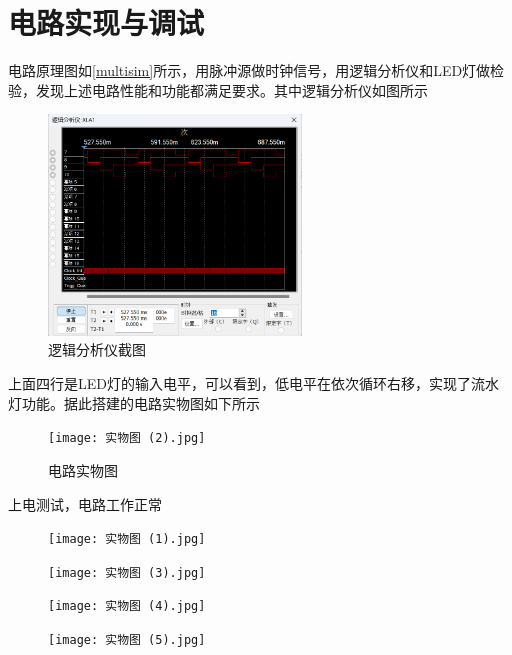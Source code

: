 \documentclass{ctexart}
\begin{document}
\section{电路实现与调试}
电路原理图如\ref{multisim}所示，用脉冲源做时钟信号，用逻辑分析仪和LED灯做检验，发现上述电路性能和功能都满足要求。其中逻辑分析仪如图所示
\begin{figure}[H]
    \centering
    \includegraphics[width=0.6\textwidth]{逻辑分析仪.png}
    \caption{逻辑分析仪截图}
\end{figure}
上面四行是LED灯的输入电平，可以看到，低电平在依次循环右移，实现了流水灯功能。据此搭建的电路实物图如下所示
\begin{figure}[H]
    \centering
    \texttt{[image: 实物图 (2).jpg]}
    \caption{电路实物图}
\end{figure}
上电测试，电路工作正常
\begin{figure}[H]
    \centering
    \begin{minipage}{0.4\textwidth}
    \centering
           \texttt{[image: 实物图 (1).jpg]}
           
    \label{}
    \end{minipage}
    \hspace{0.05\textwidth}
    \begin{minipage}{0.4\textwidth}
    \centering
           \texttt{[image: 实物图 (3).jpg]}
           
    \label{7474}
    \end{minipage}
\end{figure}
\begin{figure}[H]
    \centering
    \begin{minipage}{0.4\textwidth}
    \centering
           \texttt{[image: 实物图 (4).jpg]}
           
    \label{}
    \end{minipage}
    \hspace{0.05\textwidth}
    \begin{minipage}{0.4\textwidth}
    \centering
           \texttt{[image: 实物图 (5).jpg]}
           
    \label{7474}
    \end{minipage}
\end{figure}
\end{document}
